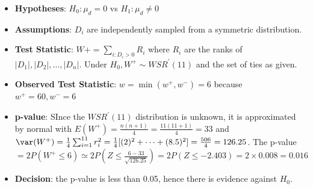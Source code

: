 \documentclass[a4paper]{article}\usepackage[]{graphicx}\usepackage[]{xcolor}
\begin{document}
	\begin{itemize}
		\item \textbf{Hypotheses}: \( H_0: \mu_d = 0 \) vs \( H_1: \mu_d \neq 0 \)
		\item \textbf{Assumptions}: \( D_i \) are independently sampled from a symmetric distribution.
		\item \textbf{Test Statistic}: \( W+ = \sum_{i:D_i > 0} R_i \) where \( R_i \) are the ranks of \( \lvert D_1 \rvert, \lvert D_2 \rvert, \dotsc, \lvert D_n \rvert \). Under \( H_0, W^+ \sim WSR^\prime(11) \) and the set of ties as given.
		\item \textbf{Observed Test Statistic}: \( w = \min(w^+,w^-) = 6 \) because \( w^+ = 60, w^- = 6 \) 
		\item \textbf{p-value}: SInce the \( WSR^\prime(11) \) distribution is unknown, it is approximated by normal with \( E(W^+) = \frac{n(n+1)}{4} = \frac{11(11+1)}{4} = 33 \) and \( \var(W^+) = \frac{1}{4} \sum_{i=1}^{11} r^{2}_{i} = \frac{1}{4} [(2)^{2}+\dotsb+(8.5)^{2}] = \frac{506}{4} = 126.25 \). The p-value \( = 2P(W^+ \leq 6) \simeq 2P (Z \leq \frac{6-33}{\sqrt{126.25}}) = 2P(Z \leq -2.403) = 2 \times 0.008 = 0.016 \)  
		\item \textbf{Decision}: the p-value is less than 0.05, hence there is evidence against \( H_0 \).
	\end{itemize}
\end{document}
